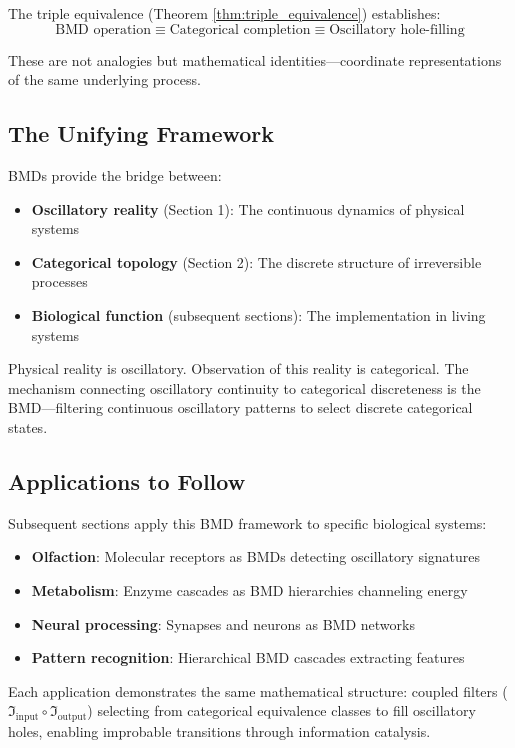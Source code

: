 \documentclass[11pt]{article}
\theoremstyle{remark}
\begin{document}
The triple equivalence (Theorem \ref{thm:triple_equivalence}) establishes:
\begin{equation}
\text{BMD operation} \equiv \text{Categorical completion} \equiv \text{Oscillatory hole-filling}
\end{equation}

These are not analogies but mathematical identities—coordinate representations of the same underlying process.

\subsection{The Unifying Framework}

BMDs provide the bridge between:
\begin{itemize}
\item \textbf{Oscillatory reality} (Section 1): The continuous dynamics of physical systems
\item \textbf{Categorical topology} (Section 2): The discrete structure of irreversible processes
\item \textbf{Biological function} (subsequent sections): The implementation in living systems
\end{itemize}

Physical reality is oscillatory. Observation of this reality is categorical. The mechanism connecting oscillatory continuity to categorical discreteness is the BMD—filtering continuous oscillatory patterns to select discrete categorical states.

\subsection{Applications to Follow}

Subsequent sections apply this BMD framework to specific biological systems:

\begin{itemize}
\item \textbf{Olfaction}: Molecular receptors as BMDs detecting oscillatory signatures
\item \textbf{Metabolism}: Enzyme cascades as BMD hierarchies channeling energy
\item \textbf{Neural processing}: Synapses and neurons as BMD networks
\item \textbf{Pattern recognition}: Hierarchical BMD cascades extracting features
\end{itemize}

Each application demonstrates the same mathematical structure: coupled filters ($\Im_{\text{input}} \circ \Im_{\text{output}}$) selecting from categorical equivalence classes to fill oscillatory holes, enabling improbable transitions through information catalysis.
\end{document}
